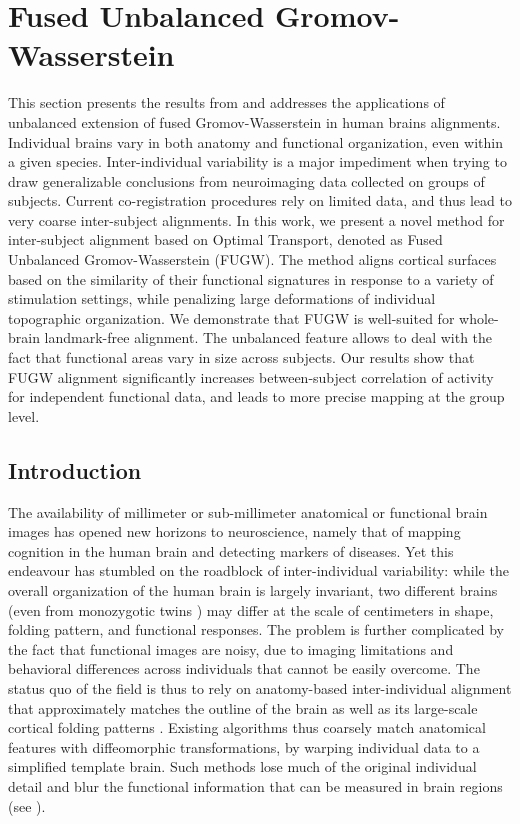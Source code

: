 \section{Fused Unbalanced Gromov-Wasserstein}

This section presents the results from \citep{Thual22} and addresses the applications of
unbalanced extension of fused Gromov-Wasserstein in human brains alignments.
Individual brains vary in both anatomy and functional organization, even within a given species.
Inter-individual variability is a major impediment when trying to draw generalizable conclusions
from neuroimaging data collected on groups of subjects.
Current co-registration procedures rely on limited data, and thus lead to very coarse
inter-subject alignments.
In this work, we present a novel method for inter-subject alignment based on Optimal Transport,
denoted as Fused Unbalanced Gromov-Wasserstein (FUGW).
The method aligns cortical surfaces based on the similarity of their functional signatures in
response to a variety of stimulation settings, while penalizing large deformations of
individual topographic organization.
We demonstrate that FUGW is well-suited for whole-brain landmark-free alignment.
The unbalanced feature allows to deal with the fact that functional areas
vary in size across subjects. Our results show that FUGW alignment significantly
increases between-subject correlation of activity for independent functional data,
and leads to more precise mapping at the group level.

\subsection{Introduction}
\label{sec:introduction}

The availability of millimeter or sub-millimeter anatomical or functional brain images has opened
new horizons to
neuroscience, namely that of mapping cognition in the human brain and detecting markers of diseases.
%
Yet this endeavour has stumbled on the roadblock of inter-individual
variability: while the overall organization of the human brain is largely invariant,
two different brains (even from monozygotic twins \citep{pizzigali2020})
may differ at the scale of centimeters in shape, folding pattern, and functional responses.
%
The problem is further complicated by the fact that functional images
are noisy, due to imaging limitations and behavioral
differences across individuals that cannot be easily overcome.
%
The status quo of the field is thus to rely on anatomy-based inter-individual alignment
that approximately matches the outline of the brain \citep{ants}
as well as its large-scale cortical folding patterns \citep{fs_reconall,fischl_freesurfer_2012}.
%
Existing algorithms thus coarsely match anatomical features with diffeomorphic transformations,
by warping individual data to a simplified template brain.
Such methods lose much of the original individual detail and blur the functional information
that can be measured in brain regions (see ).


